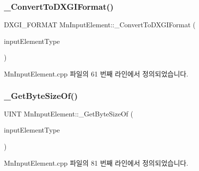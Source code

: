 \subsubsection{\texorpdfstring{\+\_\+\+Convert\+To\+D\+X\+G\+I\+Format()}{\_ConvertToDXGIFormat()}}
{\footnotesize\ttfamily D\+X\+G\+I\+\_\+\+F\+O\+R\+M\+AT Mn\+Input\+Element\+::\+\_\+\+Convert\+To\+D\+X\+G\+I\+Format (\begin{DoxyParamCaption}\item[{const \hyperlink{namespace_m_n_l_a8605571a36b2bb477280767d71fe6f9e}{Mn\+Input\+Element\+Type} \&}]{input\+Element\+Type }\end{DoxyParamCaption})\hspace{0.3cm}{\ttfamily [private]}}



Mn\+Input\+Element.\+cpp 파일의 61 번째 라인에서 정의되었습니다.

\mbox{\label{class_m_n_l_1_1_mn_input_element_ad84bf259c4a3674490f5b789b4f21e67}} 
\subsubsection{\texorpdfstring{\+\_\+\+Get\+Byte\+Size\+Of()}{\_GetByteSizeOf()}}
{\footnotesize\ttfamily U\+I\+NT Mn\+Input\+Element\+::\+\_\+\+Get\+Byte\+Size\+Of (\begin{DoxyParamCaption}\item[{const \hyperlink{namespace_m_n_l_a8605571a36b2bb477280767d71fe6f9e}{Mn\+Input\+Element\+Type} \&}]{input\+Element\+Type }\end{DoxyParamCaption})\hspace{0.3cm}{\ttfamily [private]}}



Mn\+Input\+Element.\+cpp 파일의 81 번째 라인에서 정의되었습니다.

\mbox{\label{class_m_n_l_1_1_mn_input_element_aae3dcc9e65bf14d53d7fc92803eb20da}} 
